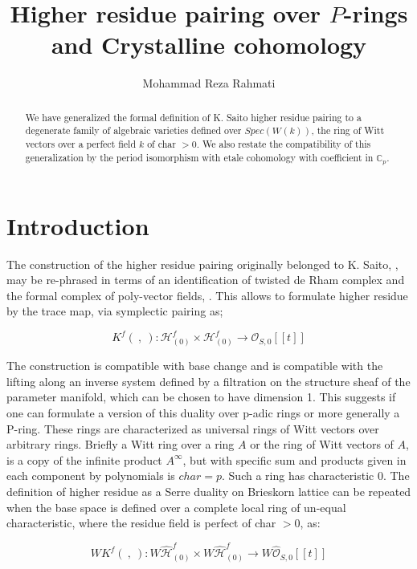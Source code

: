 \documentclass[12pt,twoside]{amsart}
\title[Higher residue pairing over $P$-rings and Crystalline cohomology]{Higher residue pairing over $P$-rings and Crystalline cohomology}
\author{Mohammad Reza Rahmati}
\begin{document}
\begin{abstract}
We have generalized the formal definition of K. Saito higher residue pairing to a degenerate family of algebraic varieties defined over $Spec(W(k))$, the ring of Witt vectors over a perfect field $k$ of char $>0$. We also restate the compatibility of this generalization by the period isomorphism with etale cohomology with coefficient 
in $\mathbb{C}_p$.
\end{abstract}

\maketitle

\section*{Introduction}

\vspace{0.5cm}

The construction of the higher residue pairing originally belonged to K. Saito, \cite{SA1}, may be re-phrased in terms of an identification of twisted de Rham complex and the formal complex of poly-vector fields, \cite{LLS}. This allows to formulate higher residue by the trace map, via symplectic pairing as;

\[ K^f( \ , \ ):\mathcal{H}_{(0)}^f \times \mathcal{H}_{(0)}^f \to \mathcal{O}_{S,0}[[t]] \]

\vspace{0.5cm}

\noindent
The construction is compatible with base change and is compatible with the lifting along an inverse system defined by a filtration on the structure sheaf of the parameter manifold, which can be chosen to have dimension 1. This suggests if one can formulate a version of this duality over p-adic rings or more generally a P-ring. These rings are characterized as universal rings of Witt vectors over arbitrary rings. Briefly a Witt ring over a ring $A$ or the ring of Witt vectors of $A$, is a copy of the infinite product $A^{\infty}$, but with specific sum and products given in each component by polynomials is $char =p$. Such a ring has characteristic $0$. The definition of higher residue as a Serre duality on Brieskorn lattice can be repeated when the base space is defined over a complete local ring of un-equal characteristic, where the residue field is perfect of char $>0$, as:

\[ WK^f( \ , \ ):W\widehat{\mathcal{H}}_{(0)}^f \times W\widehat{\mathcal{H}}_{(0)}^f \to W\widehat{\mathcal{O}}_{S,0}[[t]] \]
\end{document}

